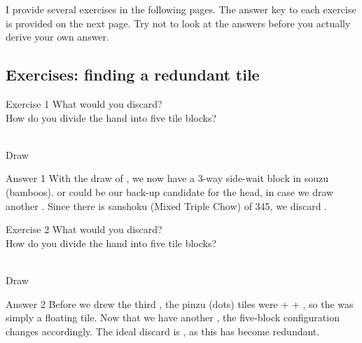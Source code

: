 \bigskip
I provide several exercises in the following pages. The answer key to each exercise is provided on the next page. Try not to look at the answers before you actually derive your own answer. 

\vfill

\subsection*{Exercises: finding a redundant tile}

\bigskip

\begin{itembox}[l]{Exercise 1}
What would you discard? \\
\vsp
How do you divide the hand into five tile blocks? 

\bp
{}~\\
\hfill\footnotesize{Draw~~~~~~~~~~~}
\ep
\end{itembox}

\newpage

\begin{itembox}[r]{Answer 1}
\emj
With the draw of {\LARGE{}}, we now have a 3-way side-wait block in {\jap souzu} (bamboos). {\LARGE{}} or {\LARGE{}} could be our back-up candidate for the head, in case we draw another {\LARGE{}}. Since there is {\jap sanshoku} (Mixed Triple Chow) of 345, we discard {\LARGE{}}. 
\end{itembox}

\vfill

\begin{itembox}[l]{Exercise 2}
What would you discard? \\
\vsp
How do you divide the hand into five tile blocks? 

\bp
{}~\\
\hfill\footnotesize{Draw~~~~~~~~~~~}
\ep
\end{itembox}

\newpage


\bigskip
\begin{itembox}[r]{Answer 2}
\emj
Before we drew the third {\LARGE{}}, the {\jap pinzu} (dots) tiles were {\LARGE{} +  + }, so the {\LARGE{}} was simply a floating tile. Now that we have another {\LARGE{}}, the five-block configuration changes accordingly. The ideal discard is {\LARGE{}}, as this has become redundant.
\end{itembox}

